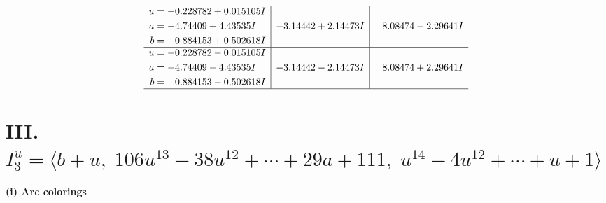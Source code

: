 \documentclass[1p]{elsarticle_modified}
\theoremstyle{definition}
\begin{document}
$$\begin{array}{c|c|c}
\begin{aligned}
u &= -0.228782 + 0.015105 I \\
a &= -4.74409 + 4.43535 I \\
b &= \phantom{-}0.884153 + 0.502618 I\end{aligned}
 & -3.14442 + 2.14473 I & \phantom{-}8.08474 - 2.29641 I \\ \hline\begin{aligned}
u &= -0.228782 - 0.015105 I \\
a &= -4.74409 - 4.43535 I \\
b &= \phantom{-}0.884153 - 0.502618 I\end{aligned}
 & -3.14442 - 2.14473 I & \phantom{-}8.08474 + 2.29641 I\\
 \hline 
 \end{array}$$\newpage\newpage\renewcommand{\arraystretch}{1}
\centering \section*{III. $I^u_{3}= \langle b+u,\;106 u^{13}-38 u^{12}+\cdots+29 a+111,\;u^{14}-4 u^{12}+\cdots+u+1 \rangle$}
\flushleft \textbf{(i) Arc colorings}\\
\end{document}
